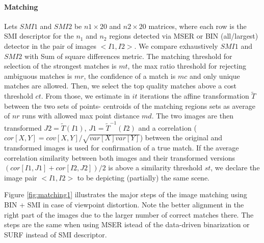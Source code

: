 \documentclass[a4paper,11pt]{article}
\begin{document}
\paragraph{Matching}

Lets $SMI1$ and $SMI2$ be $n1 \times 20$ and $n2 \times 20$ matrices, where each row is the SMI descriptor for the $n_1$ and $n_2$ regions detected via MSER or BIN (all/largest) detector in the pair of images $<I1, I2>$.
We compare exhaustively  $SMI1$ and $SMI2$ with Sum of square differences metric. The matching threshold for selection of the strongest matches is $mt$, the max ratio threshold for rejecting ambiguous matches is $mr$, the confidence of a match is $mc$ and only unique matches are allowed. Then, we select the top quality matches above a cost threshold $ct$. From those, we estimate in $it$ iterations the affine transformation ${\tilde T}$ between the two sets of points- centroids of the matching regions sets as average of $nr$ runs with allowed max point distance $md$. The two images are then transformed $J2 = {\tilde T}(I1)$, $J1 = {\tilde T}^{-1}(I2)$ and a correlation ($cor[X,Y] = cov[X,Y]/ \sqrt{var[X] var[Y]}$) between the original and transformed images is used for confirmation of a true match. If the average correlation similarity between both images and their transformed versions $(cor[I1, J1]+cor[I2, J2])/2$ is above a similarity threshold $st$, we declare the image pair $<I1, I2>$ to be depicting (partially) the same scene.

Figure \ref{fig:matching1} illustrates the major steps of the image matching using BIN + SMI in case of viewpoint distortion. Note the better alignment in the right part of the images due to the larger number of correct matches there. The steps are the same when using MSER istead of the data-driven binarization or SURF instead of SMI descriptor.
\end{document}
